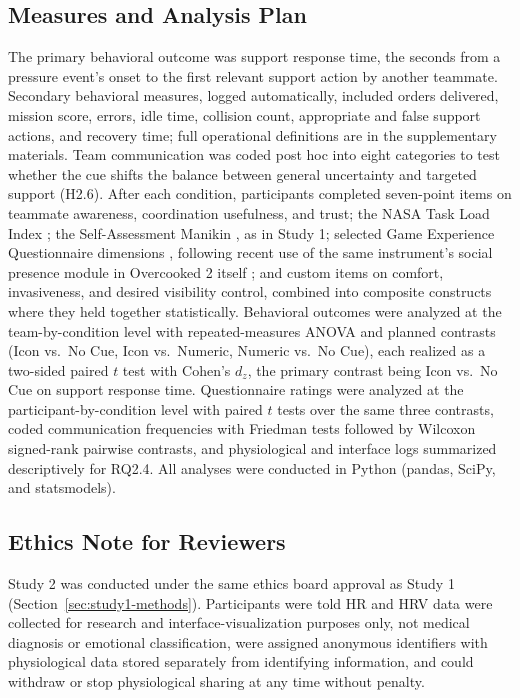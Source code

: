 \documentclass[manuscript,review,anonymous]{acmart}
\begin{document}
\subsection{Measures and Analysis Plan}
The primary behavioral outcome was support response time, the seconds from a pressure event's onset to the first relevant support action by another teammate. Secondary behavioral measures, logged automatically, included orders delivered, mission score, errors, idle time, collision count, appropriate and false support actions, and recovery time; full operational definitions are in the supplementary materials. Team communication was coded post hoc into eight categories to test whether the cue shifts the balance between general uncertainty and targeted support (H2.6). After each condition, participants completed seven-point items on teammate awareness, coordination usefulness, and trust; the NASA Task Load Index \cite{hart_development_1988}; the Self-Assessment Manikin \cite{bradley_measuring_1994}, as in Study 1; selected Game Experience Questionnaire dimensions \cite{ijsselsteijn_game_2013}, following recent use of the same instrument's social presence module in Overcooked 2 itself \cite{nurmanto_core_2025}; and custom items on comfort, invasiveness, and desired visibility control, combined into composite constructs where they held together statistically. Behavioral outcomes were analyzed at the team-by-condition level with repeated-measures ANOVA and planned contrasts (Icon vs.\ No Cue, Icon vs.\ Numeric, Numeric vs.\ No Cue), each realized as a two-sided paired $t$ test with Cohen's $d_z$, the primary contrast being Icon vs.\ No Cue on support response time. Questionnaire ratings were analyzed at the participant-by-condition level with paired $t$ tests over the same three contrasts, coded communication frequencies with Friedman tests followed by Wilcoxon signed-rank pairwise contrasts, and physiological and interface logs summarized descriptively for RQ2.4. All analyses were conducted in Python (pandas, SciPy, and statsmodels).

\subsection{Ethics Note for Reviewers}
Study 2 was conducted under the same ethics board approval as Study 1 (Section~\ref{sec:study1-methods}). Participants were told HR and HRV data were collected for research and interface-visualization purposes only, not medical diagnosis or emotional classification, were assigned anonymous identifiers with physiological data stored separately from identifying information, and could withdraw or stop physiological sharing at any time without penalty.
\end{document}
